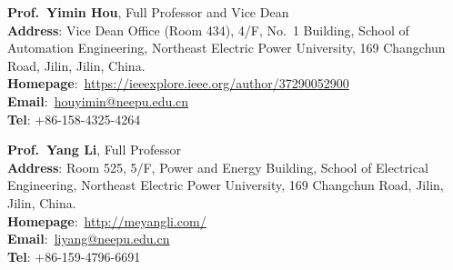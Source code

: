 \documentclass{my_cv}
\begin{document}
\noindent\textbf{Prof.~Yimin Hou}, Full Professor and Vice Dean\\
\textbf{Address}: Vice Dean Office (Room 434), 4/F, No.~1 Building, School of Automation Engineering, Northeast Electric Power University, 169 Changchun Road, Jilin, Jilin, China.\\
\textbf{Homepage}:~\href{https://ieeexplore.ieee.org/author/37290052900}{https://ieeexplore.ieee.org/author/37290052900}\\
\textbf{Email}:~\href{mailto:houyimin@neepu.edu.cn}{houyimin@neepu.edu.cn}\\
\textbf{Tel}: +86-158-4325-4264

\hspace*{\fill}

\noindent\textbf{Prof.~Yang Li}, Full Professor\\
\textbf{Address}: Room 525, 5/F, Power and Energy Building, School of Electrical Engineering, Northeast Electric Power University, 169 Changchun Road, Jilin, Jilin, China.\\
\textbf{Homepage}:~\href{http://meyangli.com/}{http://meyangli.com/}\\
\textbf{Email}:~\href{mailto:liyang@neepu.edu.cn}{liyang@neepu.edu.cn}\\
\textbf{Tel}: +86-159-4796-6691
\end{document}
